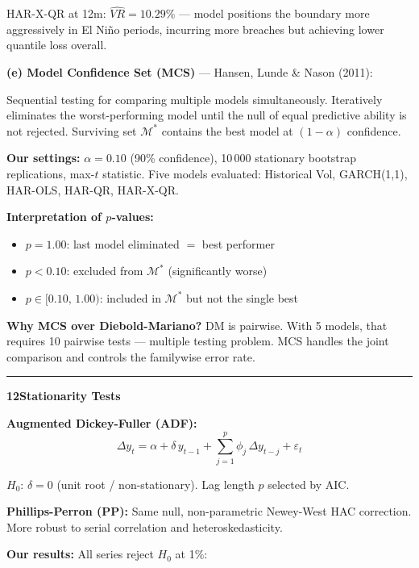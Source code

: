 \documentclass[10pt,a4paper]{article}
\newcommand{\sectionrule}{\vspace{0.3em}\hrule\vspace{0.5em}}
\begin{document}
HAR-X-QR at 12m: $\widehat{VR} = 10.29\%$ --- model positions the boundary
more aggressively in El Ni\~no periods, incurring more breaches but achieving
lower quantile loss overall.

\medskip
\textbf{(e) Model Confidence Set (MCS)} --- Hansen, Lunde \& Nason (2011):

Sequential testing for comparing multiple models simultaneously. Iteratively
eliminates the worst-performing model until the null of equal predictive
ability is not rejected. Surviving set $\mathcal{M}^*$ contains the best
model at $(1-\alpha)$ confidence.

\textbf{Our settings:} $\alpha = 0.10$ (90\% confidence), 10\,000
stationary bootstrap replications, max-$t$ statistic.
Five models evaluated: Historical Vol, GARCH(1,1), HAR-OLS, HAR-QR, HAR-X-QR.

\textbf{Interpretation of $p$-values:}
\begin{itemize}
\item $p = 1.00$: last model eliminated $=$ best performer
\item $p < 0.10$: excluded from $\mathcal{M}^*$ (significantly worse)
\item $p \in [0.10,\, 1.00)$: included in $\mathcal{M}^*$ but not the single best
\end{itemize}

\textbf{Why MCS over Diebold-Mariano?} DM is pairwise. With 5 models, that
requires 10 pairwise tests --- multiple testing problem. MCS handles the joint
comparison and controls the familywise error rate.

\sectionrule

\textbf{12\quad Stationarity Tests}

\textbf{Augmented Dickey-Fuller (ADF):}
\begin{equation*}
\Delta y_t = \alpha + \delta\,y_{t-1} + \sum_{j=1}^{p}\phi_j\,\Delta y_{t-j} + \varepsilon_t
\end{equation*}

$H_0$: $\delta = 0$ (unit root / non-stationary). Lag length $p$ selected
by AIC.

\textbf{Phillips-Perron (PP):} Same null, non-parametric Newey-West HAC
correction. More robust to serial correlation and heteroskedasticity.

\textbf{Our results:} All series reject $H_0$ at 1\%:
\end{document}
